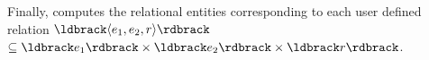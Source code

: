 
%
Finally, \framework computes the relational entities corresponding to each user defined relation $\ldbrack \langle e_1,e_2,r\rangle \rdbrack$
$\subseteq \ldbrack e_1 \rdbrack \times \ldbrack e_2 \rdbrack \times \ldbrack r \rdbrack$.

